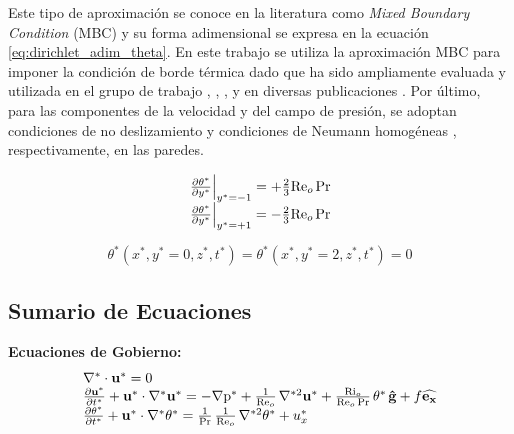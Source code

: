 Este tipo de aproximación se conoce en la literatura como \textit{Mixed Boundary \linebreak Condition} (MBC) \cite{straub2019influence} y su forma adimensional se expresa en la ecuación \ref{eq:dirichlet_adim_theta}. En este trabajo se utiliza la aproximación MBC para imponer la condición de borde térmica dado que ha sido ampliamente evaluada y utilizada en el grupo de trabajo \cite{abregu2023dns}, \cite{szuban2023}, \cite{machaca2024}, y en diversas publicaciones \cite{kawamura2000dns, kasagi1992direct}. Por último, para las componentes de la velocidad y del campo de presión, se adoptan condiciones de no deslizamiento y condiciones de Neumann homogéneas \cite{bartholomew2020xcompact3d}, respectivamente, en las paredes. 

\begin{align}
\begin{array}{l}
    \left. \frac{\partial \theta^*}{\partial y^*} \right\vert_{y^*=-1} = + \frac{2}{3} \text{Re}_o \hspace{0.5mm} \text{Pr} \\
    \left. \frac{\partial \theta^*}{\partial y^*} \right\vert_{y^*=+1} = - \frac{2}{3} \text{Re}_o \hspace{0.5mm} \text{Pr} 
\end{array}
\label{eq:neumann_adim}
\end{align}

\begin{equation}
\theta^*(x^*,y^*=0,z^*,t^*) = \theta^*(x^*,y^*=2,z^*,t^*) = 0
\label{eq:dirichlet_adim_theta}
\end{equation}



\subsection*{Sumario de Ecuaciones}

\textbf{Ecuaciones de Gobierno:}
\begin{equation}
\begin{array}{l}
    \nabla^* \cdot \mathbf{u^*} = 0 \\
    \frac{\partial \mathbf{u^*}}{\partial t^*} + \mathbf{u^*} \cdot \nabla^* \mathbf{u^*} = 
    -\nabla \text{p}^* + \frac{1}{\text{Re}_o} \hspace{0.5mm} \nabla^{*2} \mathbf{u^*} + \frac{\text{Ri}_o}{\text{Re}_o \hspace{0.5mm} \text{Pr}} \hspace{0.5mm} \theta^* \hspace{0.5mm} \mathbf{\hat{g}} + f \mathbf{\widehat{e_x}}  \\
    \frac{\partial \theta^*}{\partial t^*} + \mathbf{u^*} \cdot \nabla^* \theta^* = 
    \frac{1}{\text{Pr}}\hspace{0.5mm}  \frac{1}{\text{Re}_o} \hspace{0.5mm} \nabla^{*2} \theta^* + u_x^* 
\end{array}
\label{eq:gob_system_res1}
\end{equation}

